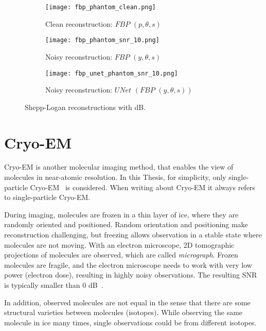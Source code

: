 \begin{figure}[H]
    \captionsetup[subfigure]{justification=centering}
    \centering
    \begin{subfigure}[t]{0.3\textwidth}
        \texttt{[image: fbp\_phantom\_clean.png]}
        \caption{Clean reconstruction: $\textit{FBP }(p, \theta, s)$}
        \label{fig:fbp_phantom}
    \end{subfigure}\hfill
    \begin{subfigure}[t]{0.3\textwidth}
      \texttt{[image: fbp\_phantom\_snr\_10.png]}
      \caption{Noisy reconstruction: $\textit{FBP }(y, \theta, s)$}
      \label{fig:fbp_phantom_noisy}
    \end{subfigure}\hfill
    \begin{subfigure}[t]{0.3\textwidth}
      \texttt{[image: fbp\_unet\_phantom\_snr\_10.png]}
      \caption{Noisy reconstruction: $\textit{UNet }(\textit{FBP }(y, \theta, s))$}
      \label{fig:fbp_unet_phantom_noisy}
    \end{subfigure}
    \caption{Shepp-Logan reconstructions with  dB.}
    \label{fig:phantom_fbps}
  \end{figure}


\section{Cryo-EM}
Cryo-EM is another molecular imaging method, that enables the view of molecules in near-atomic resolution.
In this Thesis, for simplicity, only single-particle Cryo-EM~\cite{singleParticleCryoEm} is considered.
When writing about Cryo-EM it always refers to single-particle Cryo-EM.

During imaging, molecules are frozen in a thin layer of ice, where they are randomly oriented and positioned. 
Random orientation and positioning make reconstruction challenging, 
but freezing allows observation in a stable state where molecules are not moving.
With an electron microscope, 2D tomographic projections of molecules are observed,
which are called \textit{micrograph}. 
Frozen molecules are fragile, and the electron microscope needs to work with
very low power (electron dose), resulting in highly noisy observations. The resulting SNR
is typically smaller than 0 dB~\cite{cryoEmMath2}.

In addition, observed molecules are not equal in the sense that there are some structural varieties between
molecules (isotopes). While observing the same molecule in ice many times, single observations could be from different isotopes.

